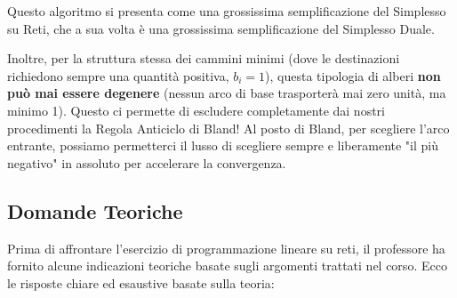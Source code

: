 \documentclass[12pt, a4paper]{article}
\begin{document}
	Questo algoritmo si presenta come una grossissima semplificazione del Simplesso su Reti, che a sua volta è una grossissima semplificazione del Simplesso Duale.
	
	Inoltre, per la struttura stessa dei cammini minimi (dove le destinazioni richiedono sempre una quantità positiva, $b_i = 1$), questa tipologia di alberi \textbf{non può mai essere degenere} (nessun arco di base trasporterà mai zero unità, ma minimo 1).
	Questo ci permette di escludere completamente dai nostri procedimenti la Regola Anticiclo di Bland! Al posto di Bland, per scegliere l'arco entrante, possiamo permetterci il lusso di scegliere sempre e liberamente "il più negativo" in assoluto per accelerare la convergenza.
	
	\subsection*{Domande Teoriche}
	
	Prima di affrontare l'esercizio di programmazione lineare su reti, il professore ha fornito alcune indicazioni teoriche basate sugli argomenti trattati nel corso. Ecco le risposte chiare ed esaustive basate sulla teoria:
	
\end{document}
